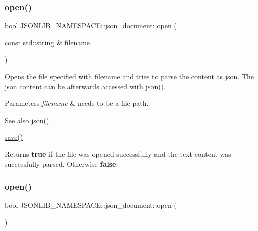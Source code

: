 \subsubsection{\texorpdfstring{open()}{open()}\hspace{0.1cm}{\footnotesize\ttfamily [1/4]}}
{\footnotesize\ttfamily bool J\+S\+O\+N\+L\+I\+B\+\_\+\+N\+A\+M\+E\+S\+P\+A\+C\+E\+::json\+\_\+document\+::open (\begin{DoxyParamCaption}\item[{const std\+::string \&}]{filename }\end{DoxyParamCaption})}



Opens the file specified with {\ttfamily filename} and tries to parse the content as json. The json content can be afterwards accessed with \hyperlink{classJSONLIB__NAMESPACE_1_1json__document_ad87b8e7d68ba854dbd730758273a3b93}{json()}. 


\begin{DoxyParams}{Parameters}
{\em filename} & needs to be a file path. \\
\hline
\end{DoxyParams}
\begin{DoxySeeAlso}{See also}
\hyperlink{classJSONLIB__NAMESPACE_1_1json__document_ad87b8e7d68ba854dbd730758273a3b93}{json()} 

\hyperlink{classJSONLIB__NAMESPACE_1_1json__document_af8f392a0ffc779277ead1f2bdb222930}{save()} 
\end{DoxySeeAlso}
\begin{DoxyReturn}{Returns}
{\bfseries true} if the file was opened successfully and the text content was successfully parsed. Otherwise {\bfseries false}. 
\end{DoxyReturn}
\mbox{\label{classJSONLIB__NAMESPACE_1_1json__document_a08e509059e628742f35716dddce2d740}} 
\subsubsection{\texorpdfstring{open()}{open()}\hspace{0.1cm}{\footnotesize\ttfamily [2/4]}}
{\footnotesize\ttfamily bool J\+S\+O\+N\+L\+I\+B\+\_\+\+N\+A\+M\+E\+S\+P\+A\+C\+E\+::json\+\_\+document\+::open (\begin{DoxyParamCaption}{ }\end{DoxyParamCaption})}




